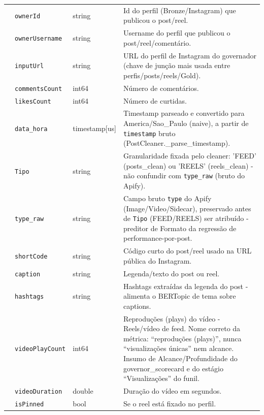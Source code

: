 \begin{footnotesize}
\begin{longtable}{p{3.2cm}p{3.0cm}p{2.0cm}p{6.0cm}}
\texttt{} & \texttt{ownerId} & string & Id do perfil (Bronze/\allowbreak{}Instagram) que publicou o post/\allowbreak{}reel. \\
\texttt{} & \texttt{ownerUsername} & string & Username do perfil que publicou o post/\allowbreak{}reel/\allowbreak{}comentário. \\
\texttt{} & \texttt{inputUrl} & string & URL do perfil de Instagram do governador (chave de junção mais usada entre perfis/\allowbreak{}posts/\allowbreak{}reels/\allowbreak{}Gold). \\
\texttt{} & \texttt{commentsCount} & int64 & Número de comentários. \\
\texttt{} & \texttt{likesCount} & int64 & Número de curtidas. \\
\texttt{} & \texttt{data\_\allowbreak{}hora} & timestamp[us] & Timestamp parseado e convertido para America/\allowbreak{}Sao\_\allowbreak{}Paulo (naive), a partir de \texttt{timestamp} bruto (PostCleaner.\_\allowbreak{}parse\_\allowbreak{}timestamp). \\
\texttt{} & \texttt{Tipo} & string & Granularidade fixada pelo cleaner: 'FEED' (posts\_\allowbreak{}clean) ou 'REELS' (reels\_\allowbreak{}clean) - não confundir com \texttt{type\_\allowbreak{}raw} (bruto do Apify). \\
\texttt{} & \texttt{type\_\allowbreak{}raw} & string & Campo bruto \texttt{type} do Apify (Image/\allowbreak{}Video/\allowbreak{}Sidecar), preservado antes de \texttt{Tipo} (FEED/\allowbreak{}REELS) ser atribuído - preditor de Formato da regressão de performance-por-post. \\
\texttt{} & \texttt{shortCode} & string & Código curto do post/\allowbreak{}reel usado na URL pública do Instagram. \\
\texttt{} & \texttt{caption} & string & Legenda/\allowbreak{}texto do post ou reel. \\
\texttt{} & \texttt{hashtags} & string & Hashtags extraídas da legenda do post - alimenta o BERTopic de tema sobre captions. \\
\texttt{} & \texttt{videoPlayCount} & int64 & Reproduções (plays) do vídeo - Reels/\allowbreak{}vídeo de feed. Nome correto da métrica: ``reproduções (plays)'', nunca ``visualizações únicas'' nem alcance. Insumo de Alcance/\allowbreak{}Profundidade do governor\_\allowbreak{}scorecard e do estágio ``Visualizações'' do funil. \\
\texttt{} & \texttt{videoDuration} & double & Duração do vídeo em segundos. \\
\texttt{} & \texttt{isPinned} & bool & Se o reel está fixado no perfil. \\

\end{longtable}
\end{footnotesize}
